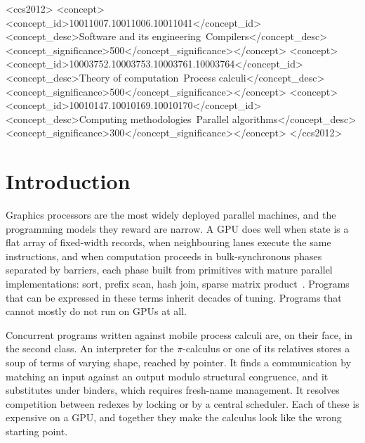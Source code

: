 \documentclass[acmsmall,screen,review,anonymous]{acmart}
\begin{document}
\begin{CCSXML}
<ccs2012>
<concept><concept_id>10011007.10011006.10011041</concept_id><concept_desc>Software and its engineering~Compilers</concept_desc><concept_significance>500</concept_significance></concept>
<concept><concept_id>10003752.10003753.10003761.10003764</concept_id><concept_desc>Theory of computation~Process calculi</concept_desc><concept_significance>500</concept_significance></concept>
<concept><concept_id>10010147.10010169.10010170</concept_id><concept_desc>Computing methodologies~Parallel algorithms</concept_desc><concept_significance>300</concept_significance></concept>
</ccs2012>
\end{CCSXML}


\maketitle

\section{Introduction}
\label{sec:intro}

Graphics processors are the most widely deployed parallel machines, and the
programming models they reward are narrow. A GPU does well when state is a
flat array of fixed-width records, when neighbouring lanes execute the same
instructions, and when computation proceeds in bulk-synchronous phases
separated by barriers, each phase built from primitives with mature parallel
implementations: sort, prefix scan, hash join, sparse matrix
product~\cite{Valiant90,Blelloch96,GraphBLAS11}. Programs that can be
expressed in these terms inherit decades of tuning. Programs that cannot
mostly do not run on GPUs at all.

Concurrent programs written against mobile process calculi are, on their
face, in the second class. An interpreter for the $\pi$-calculus or one of
its relatives stores a soup of terms of varying shape, reached by pointer. It
finds a communication by matching an input against an output modulo
structural congruence, and it substitutes under binders, which requires
fresh-name management. It resolves competition between redexes by locking or
by a central scheduler. Each of these is expensive on a GPU, and together
they make the calculus look like the wrong starting point.
\end{document}
